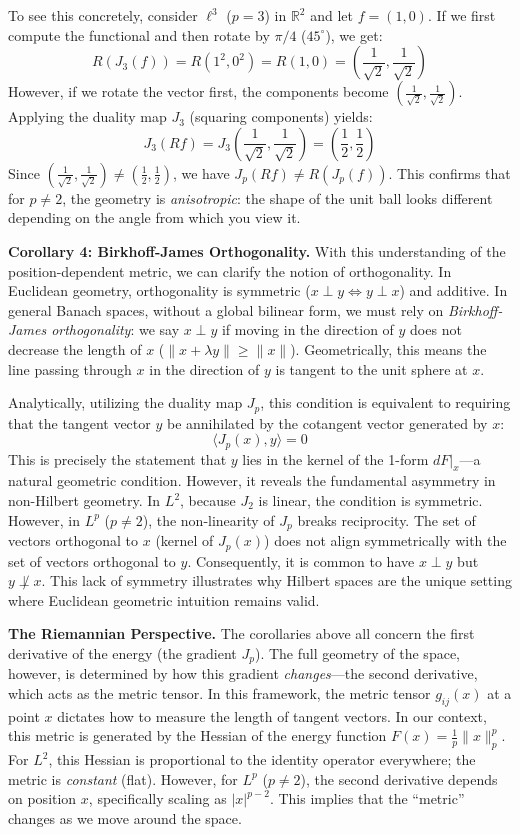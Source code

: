 \documentclass{article}
\newcommand{\R}{{\mathbb{R}}}
\begin{document}
To see this concretely, consider $\ell^3$ ($p=3$) in $\R^2$ and let $f = (1, 0)$. If we first compute the functional and then rotate by $\pi/4$ ($45^\circ$), we get:
\[
	R(J_3(f)) = R(1^2, 0^2) = R(1, 0) = \left( \frac{1}{\sqrt{2}}, \frac{1}{\sqrt{2}} \right)
\]
However, if we rotate the vector first, the components become $(\frac{1}{\sqrt{2}}, \frac{1}{\sqrt{2}})$.
Applying the duality map $J_3$ (squaring components) yields:
\[
	J_3(Rf) = J_3\left( \frac{1}{\sqrt{2}}, \frac{1}{\sqrt{2}} \right) = \left( \frac{1}{2}, \frac{1}{2} \right)
\]
Since $(\frac{1}{\sqrt{2}}, \frac{1}{\sqrt{2}}) \ne (\frac{1}{2}, \frac{1}{2})$, we have $J_p(Rf) \ne
R(J_p(f))$. This confirms that for $p \ne 2$, the geometry is \emph{anisotropic}: the shape of the unit ball looks different depending on the angle from which you view it.

\medskip\noindent\textbf{Corollary 4: Birkhoff-James Orthogonality.}\quad
With this understanding of the position-dependent metric, we can clarify the notion of orthogonality.
In Euclidean geometry, orthogonality is symmetric ($x \perp y \iff y \perp x$) and additive. In
general Banach spaces, without a global bilinear form, we must rely on \emph{Birkhoff-James orthogonality}: we say $x \perp y$ if moving in the direction of $y$ does not decrease the length of $x$ ($\|x + \lambda y\| \ge \|x\|$). Geometrically, this means the line passing through $x$ in the direction of $y$ is tangent to the unit sphere at $x$.

Analytically, utilizing the duality map $J_p$, this condition is equivalent to requiring that the tangent
vector $y$ be annihilated by the cotangent vector generated by $x$:
\[
	\langle J_p(x), y \rangle = 0
\]
This is precisely the statement that $y$ lies in the kernel of the 1-form $dF|_x$---a natural geometric
condition. However, it reveals the fundamental asymmetry in non-Hilbert geometry. In $L^2$, because $J_2$ is linear, the condition is symmetric. However, in $L^p$ ($p \ne 2$), the non-linearity of $J_p$ breaks reciprocity. The set of vectors orthogonal to $x$ (kernel of $J_p(x)$) does not align symmetrically with the set of vectors orthogonal to $y$. Consequently, it is common to have $x \perp y$ but $y \not\perp x$. This lack of symmetry illustrates why Hilbert spaces are the unique setting where Euclidean geometric intuition remains valid.

\medskip\noindent\textbf{The Riemannian Perspective.}\quad
The corollaries above all concern the first derivative of the energy (the gradient $J_p$). The full geometry of
the space, however, is determined by how this gradient \emph{changes}---the second derivative,
which acts as the metric tensor. In this framework, the metric tensor $g_{ij}(x)$ at a point $x$ dictates how
to measure the length of tangent vectors. In our context, this metric is generated by the Hessian of the
energy function $F(x) = \frac{1}{p}\|x\|_p^p$. For $L^2$, this Hessian is proportional to the identity
operator everywhere; the metric is \emph{constant} (flat). However, for $L^p$ ($p \ne 2$), the second
derivative depends on position $x$, specifically scaling as $|x|^{p-2}$. This implies that the ``metric''
changes as we move around the space.
\end{document}
